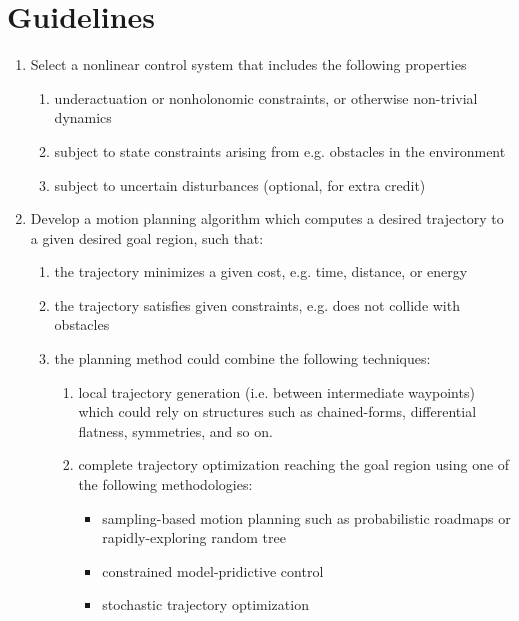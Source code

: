 \documentclass[11pt]{article}
\begin{document}
\section{Guidelines}
\begin{enumerate}
\item Select a nonlinear control system that includes the following properties
  \begin{enumerate}
  \item underactuation or nonholonomic constraints, or otherwise non-trivial
    dynamics
  \item subject to state constraints arising from e.g. obstacles in the environment
  \item subject to uncertain disturbances (optional, for extra credit)
  \end{enumerate}
\item Develop a motion planning algorithm which computes a desired trajectory
  to a given desired goal region, such that:
  \begin{enumerate}
  \item the trajectory minimizes a given cost, e.g. time, distance, or energy
  \item the trajectory satisfies given constraints, e.g. does not collide with
    obstacles
  \item the planning method could combine the following techniques:
    \begin{enumerate}
    \item local trajectory generation (i.e. between intermediate waypoints)
      which could rely on structures such as chained-forms, differential
      flatness, symmetries, and so on.
    \item complete trajectory optimization reaching the goal region using
      one of the following methodologies:
      \begin{itemize}
      \item sampling-based motion planning such as probabilistic roadmaps
        or rapidly-exploring random tree
      \item constrained model-pridictive control%
      \item stochastic trajectory optimization
      \end{itemize}
    \end{enumerate}
  \end{enumerate}

\end{enumerate}
\end{document}
